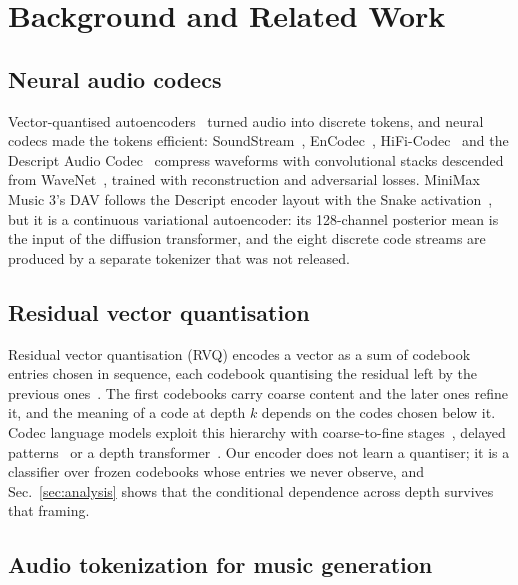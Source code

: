 \section{Background and Related Work}

\subsection{Neural audio codecs}

Vector-quantised autoencoders~\cite{oord2017vqvae} turned audio into discrete tokens, and neural codecs made the tokens efficient: SoundStream~\cite{zeghidour2021soundstream}, EnCodec~\cite{defossez2022encodec}, HiFi-Codec~\cite{yang2023hificodec} and the Descript Audio Codec~\cite{kumar2023dac} compress waveforms with convolutional stacks descended from WaveNet~\cite{oord2016wavenet}, trained with reconstruction and adversarial losses. MiniMax Music 3's DAV follows the Descript encoder layout with the Snake activation~\cite{ziyin2020snake}, but it is a continuous variational autoencoder: its 128-channel posterior mean is the input of the diffusion transformer, and the eight discrete code streams are produced by a separate tokenizer that was not released.

\subsection{Residual vector quantisation}

Residual vector quantisation (RVQ) encodes a vector as a sum of codebook entries chosen in sequence, each codebook quantising the residual left by the previous ones~\cite{zeghidour2021soundstream}. The first codebooks carry coarse content and the later ones refine it, and the meaning of a code at depth $k$ depends on the codes chosen below it. Codec language models exploit this hierarchy with coarse-to-fine stages~\cite{borsos2023audiolm}, delayed patterns~\cite{copet2023musicgen} or a depth transformer~\cite{defossez2024moshi}. Our encoder does not learn a quantiser; it is a classifier over frozen codebooks whose entries we never observe, and Sec.~\ref{sec:analysis} shows that the conditional dependence across depth survives that framing.

\subsection{Audio tokenization for music generation}

